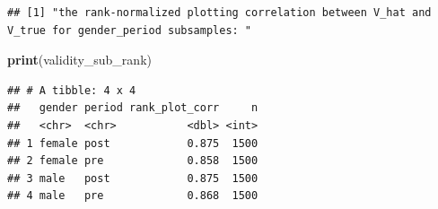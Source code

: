 \documentclass[
]{article}
\newenvironment{Shaded}{\begin{snugshade}}{\end{snugshade}}
\newcommand{\FunctionTok}[1]{\textcolor[rgb]{0.13,0.29,0.53}{\textbf{#1}}}
\newcommand{\NormalTok}[1]{#1}
\begin{document}
\begin{verbatim}
## [1] "the rank-normalized plotting correlation between V_hat and V_true for gender_period subsamples: "
\end{verbatim}

\begin{Shaded}
\begin{Highlighting}[]
\FunctionTok{print}\NormalTok{(validity\_sub\_rank)}
\end{Highlighting}
\end{Shaded}

\begin{verbatim}
## # A tibble: 4 x 4
##   gender period rank_plot_corr     n
##   <chr>  <chr>           <dbl> <int>
## 1 female post            0.875  1500
## 2 female pre             0.858  1500
## 3 male   post            0.875  1500
## 4 male   pre             0.868  1500
\end{verbatim}
\end{document}

